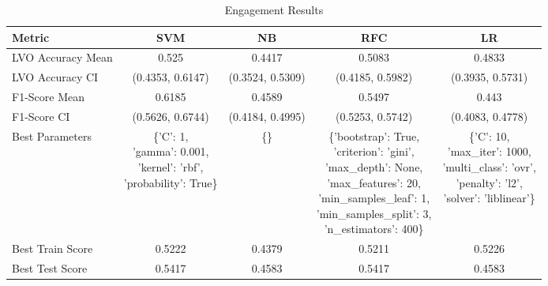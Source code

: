 \begin{table}[h!]
\centering
\begin{tabular}{|l|c|c|c|c|}
\hline
\textbf{Metric}           & \textbf{SVM}    & \textbf{NB}     & \textbf{RFC}    & \textbf{LR}     \\ \hline
LVO Accuracy Mean         & 0.525           & 0.4417          & 0.5083          & 0.4833          \\ \hline
LVO Accuracy CI           & (0.4353, 0.6147)& (0.3524, 0.5309)& (0.4185, 0.5982)& (0.3935, 0.5731)\\ \hline
F1-Score Mean             & 0.6185          & 0.4589          & 0.5497          & 0.443           \\ \hline
F1-Score CI               & (0.5626, 0.6744)& (0.4184, 0.4995)& (0.5253, 0.5742)& (0.4083, 0.4778)\\ \hline
Best Parameters           & \makecell[l]{\{'C': 1,\\ 'gamma': 0.001,\\ 'kernel': 'rbf',\\ 'probability': True\}} & \{\} & \makecell[l]{\{'bootstrap': True,\\ 'criterion': 'gini',\\ 'max\_depth': None,\\ 'max\_features': 20,\\ 'min\_samples\_leaf': 1,\\ 'min\_samples\_split': 3,\\ 'n\_estimators': 400\}} & \makecell[l]{\{'C': 10,\\ 'max\_iter': 1000,\\ 'multi\_class': 'ovr',\\ 'penalty': 'l2',\\ 'solver': 'liblinear'\}} \\ \hline
Best Train Score          & 0.5222          & 0.4379          & 0.5211          & 0.5226          \\ \hline
Best Test Score           & 0.5417          & 0.4583          & 0.5417          & 0.4583          \\ \hline
\end{tabular}
\caption{Engagement Results}
\label{table:engagement}
\end{table}


